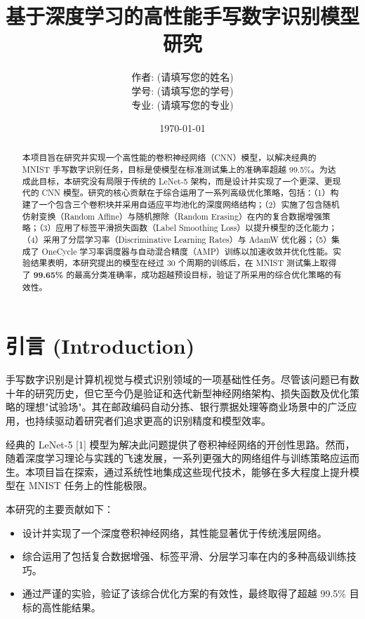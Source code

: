 \documentclass[UTF8]{ctexart}
\title{\textbf{基于深度学习的高性能手写数字识别模型研究}}
\author{作者: (请填写您的姓名) \\ 学号: (请填写您的学号) \\ 专业: (请填写您的专业)}
\date{\today}
\begin{document}
\maketitle
\thispagestyle{empty}

\begin{abstract}
\noindent
本项目旨在研究并实现一个高性能的卷积神经网络（CNN）模型，以解决经典的 MNIST 手写数字识别任务，目标是使模型在标准测试集上的准确率超越 99.5\%。为达成此目标，本研究没有局限于传统的 LeNet-5 架构，而是设计并实现了一个更深、更现代的 CNN 模型。研究的核心贡献在于综合运用了一系列高级优化策略，包括：（1）构建了一个包含三个卷积块并采用自适应平均池化的深度网络结构；（2）实施了包含随机仿射变换（Random Affine）与随机擦除（Random Erasing）在内的复合数据增强策略；（3）应用了标签平滑损失函数（Label Smoothing Loss）以提升模型的泛化能力；（4）采用了分层学习率（Discriminative Learning Rates）与 AdamW 优化器；（5）集成了 OneCycle 学习率调度器与自动混合精度（AMP）训练以加速收敛并优化性能。实验结果表明，本研究提出的模型在经过 30 个周期的训练后，在 MNIST 测试集上取得了 \textbf{99.65\%} 的最高分类准确率，成功超越预设目标，验证了所采用的综合优化策略的有效性。
\end{abstract}

\section{引言 (Introduction)}

手写数字识别是计算机视觉与模式识别领域的一项基础性任务。尽管该问题已有数十年的研究历史，但它至今仍是验证和迭代新型神经网络架构、损失函数及优化策略的理想"试验场"。其在邮政编码自动分拣、银行票据处理等商业场景中的广泛应用，也持续驱动着研究者们追求更高的识别精度和模型效率。

经典的 LeNet-5 [1] 模型为解决此问题提供了卷积神经网络的开创性思路。然而，随着深度学习理论与实践的飞速发展，一系列更强大的网络组件与训练策略应运而生。本项目旨在探索，通过系统性地集成这些现代技术，能够在多大程度上提升模型在 MNIST 任务上的性能极限。

本研究的主要贡献如下：
\begin{itemize}
    \item 设计并实现了一个深度卷积神经网络，其性能显著优于传统浅层网络。
    \item 综合运用了包括复合数据增强、标签平滑、分层学习率在内的多种高级训练技巧。
    \item 通过严谨的实验，验证了该综合优化方案的有效性，最终取得了超越 99.5\% 目标的高性能结果。
\end{itemize}
\end{document}
